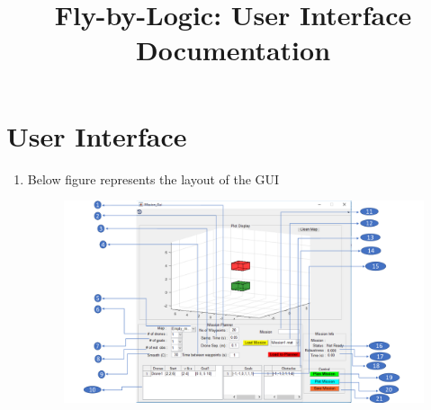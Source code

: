 \documentclass[english]{article}
\title{Fly-by-Logic: User Interface Documentation}
\begin{document}
\maketitle
\section{User Interface}
\begin{enumerate}
    \item Below figure represents the layout of the GUI
        \begin{figure}[H]
        \centering
        \includegraphics[scale=0.6]{layout.pdf}
    \end{figure}
\end{enumerate}
\end{document}

